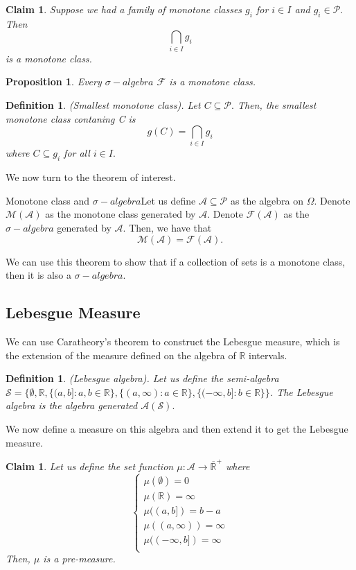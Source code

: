 \documentclass[twoside]{article}
\newtheorem{proposition}[theorem]{Proposition}
\newtheorem{claim}[theorem]{Claim}
\newtheorem{definition}[theorem]{Definition}
\newcommand{\algebra}{\mathcal{A}}
\newcommand{\semialgebra}{\mathcal{S}}
\newcommand{\sigmalgebra}{\mathcal{F}}
\newcommand{\sa}{\sigma-algebra}
\newcommand{\powerset}{\mathcal{P}}
\newcommand{\positiveextendedreal}{\overline{\mathbb{R}}^+}
\begin{document}
\begin{claim}Suppose we had a family of monotone classes $g_i$ for $i \in I$ and $g_i \in \powerset.$ Then 
$$
\bigcap_{i \in I}g_i
$$
is a monotone class.
\end{claim}

\begin{proposition}Every $\sa$ $\sigmalgebra$ is a monotone class.
\end{proposition}

\begin{definition}(Smallest monotone class). Let $C \subseteq \powerset.$ Then, the smallest monotone class contaning C is 
$$
g(C) = \bigcap_{i \in I}g_i
$$
where $C \subseteq g_i$ for all $i \in I.$
\end{definition}


We now turn to the theorem of interest.
\begin{theorem_exam}{Monotone class and $\sa$}{}Let us define $\algebra \subseteq \powerset$ as the algebra on $\Omega.$ Denote $\mathcal{M}(\algebra)$ as the monotone class generated by $\algebra.$ Denote $\sigmalgebra(\algebra)$ as the $\sa$ generated by $\algebra.$ Then, we have that 
$$
\mathcal{M}(\algebra) = \sigmalgebra(\algebra).
$$
\end{theorem_exam}


We can use this theorem to show that if a collection of sets is a monotone class, then it is also a $\sa.$

\subsection{Lebesgue Measure}

We can use Caratheory's theorem to construct the Lebesgue measure, which is the extension of the measure defined on the algebra of $\mathbb{R}$ intervals.

\begin{definition}(Lebesgue algebra). Let us define the semi-algebra $\semialgebra = \{\emptyset, \mathbb{R}, \{(a,b]: a,b \in \mathbb{R}\}, \{(a,\infty): a \in \mathbb{R}\}, \{(-\infty,b]: b \in \mathbb{R}\}\}$. The Lebesgue algebra is the algebra generated $\algebra(\semialgebra).$
\end{definition}

We now define a measure on this algebra and then extend it to get the Lebesgue measure.

\begin{claim}Let us define the set function $\mu: \algebra \rightarrow \positiveextendedreal$ where 
$$
\begin{cases}
\mu(\emptyset) = 0\\
\mu(\mathbb{R}) = \infty\\
\mu((a,b]) = b - a\\
\mu((a, \infty)) = \infty\\
\mu((-\infty,b]) = \infty\\
\end{cases}
$$
Then, $\mu$ is a pre-measure.
\end{claim}
\end{document}
